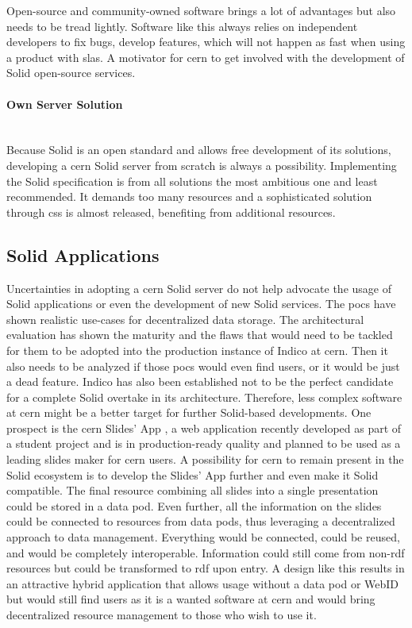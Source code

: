 Open-source and community-owned software brings a lot of advantages but also needs to be tread lightly. Software like this always relies on independent developers to fix bugs, develop features, which will not happen as fast when using a product with \glspl{sla}. A motivator for \gls{cern} to get involved with the development of Solid open-source services.
\vspace{0.5cm}
\paragraph{Own Server Solution}\mbox{}\\

Because Solid is an open standard and allows free development of its solutions, developing a \gls{cern} Solid server from scratch is always a possibility. Implementing the Solid specification is from all solutions the most ambitious one and least recommended. It demands too many resources and a sophisticated solution through \gls{css} is almost released, benefiting from additional resources.

\subsection{Solid Applications}

Uncertainties in adopting a \gls{cern} Solid server do not help advocate the usage of Solid applications or even the development of new Solid services. The \glspl{poc} have shown realistic use-cases for decentralized data storage. The architectural evaluation has shown the maturity and the flaws that would need to be tackled for them to be adopted into the production instance of Indico at \gls{cern}. Then it also needs to be analyzed if those \glspl{poc} would even find users, or it would be just a dead feature. Indico has also been established not to be the perfect candidate for a complete Solid overtake in its architecture. Therefore, less complex software at \gls{cern} might be a better target for further Solid-based developments. One prospect is the \gls{cern} Slides' App \cite{cern-slides}, a web application recently developed as part of a student project and is in production-ready quality and planned to be used as a leading slides maker for \gls{cern} users. A possibility for \gls{cern} to remain present in the Solid ecosystem is to develop the Slides' App further and even make it Solid compatible. The final resource combining all slides into a single presentation could be stored in a data pod. Even further, all the information on the slides could be connected to resources from data pods, thus leveraging a decentralized approach to data management. Everything would be connected, could be reused, and would be completely interoperable. Information could still come from non-\gls{rdf} resources but could be transformed to \gls{rdf} upon entry. A design like this results in an attractive hybrid application that allows usage without a data pod or WebID but would still find users as it is a wanted software at \gls{cern} and would bring decentralized resource management to those who wish to use it.

